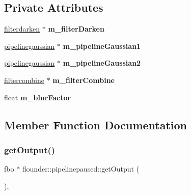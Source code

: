 \subsection*{Private Attributes}
\begin{DoxyCompactItemize}
\item 
\mbox{\label{classflounder_1_1pipelinepaused_aef4803533d019bb584e30a9debf8af0c}} 
\hyperlink{classflounder_1_1filterdarken}{filterdarken} $\ast$ {\bfseries m\+\_\+filter\+Darken}
\item 
\mbox{\label{classflounder_1_1pipelinepaused_a6e4395e9c9dbd6ff4d0e77fec39ddb12}} 
\hyperlink{classflounder_1_1pipelinegaussian}{pipelinegaussian} $\ast$ {\bfseries m\+\_\+pipeline\+Gaussian1}
\item 
\mbox{\label{classflounder_1_1pipelinepaused_a605ccd633c6bbeddb66ecdd96de4ffba}} 
\hyperlink{classflounder_1_1pipelinegaussian}{pipelinegaussian} $\ast$ {\bfseries m\+\_\+pipeline\+Gaussian2}
\item 
\mbox{\label{classflounder_1_1pipelinepaused_addb73e22ca935d192d7dd5968e6e8016}} 
\hyperlink{classflounder_1_1filtercombine}{filtercombine} $\ast$ {\bfseries m\+\_\+filter\+Combine}
\item 
\mbox{\label{classflounder_1_1pipelinepaused_aa92c86b99eebfd54ae3da5af986c3b4c}} 
float {\bfseries m\+\_\+blur\+Factor}
\end{DoxyCompactItemize}


\subsection{Member Function Documentation}
\mbox{\label{classflounder_1_1pipelinepaused_a7824b6364878b5aaf57921e2a7a4915a}} 
\subsubsection{\texorpdfstring{get\+Output()}{getOutput()}}
{\footnotesize\ttfamily fbo $\ast$ flounder\+::pipelinepaused\+::get\+Output (\begin{DoxyParamCaption}{ }\end{DoxyParamCaption})\hspace{0.3cm}{\ttfamily [override]}, {\ttfamily [virtual]}}



